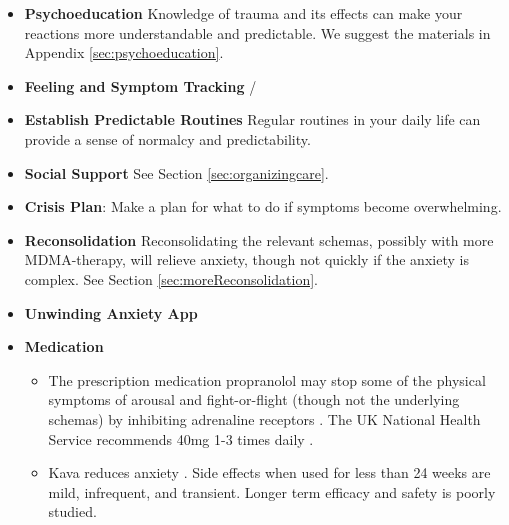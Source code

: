\documentclass[12pt,letterpaper]{book}
\begin{document}
\begin{itemize}
\begin{itemize}
    \end{itemize}
    \item \textbf{Psychoeducation} Knowledge of trauma and its effects can make your reactions more understandable and predictable. We suggest the materials in Appendix \ref{sec:psychoeducation}.
    \item \textbf{Feeling and Symptom Tracking} /
    \item \textbf{Establish Predictable Routines} Regular routines in your daily life can provide a sense of normalcy and predictability. 
    \item \textbf{Social Support} See Section \ref{sec:organizingcare}.
    \item \textbf{Crisis Plan}: Make a plan for what to do if symptoms become overwhelming. 
    \item \textbf{Reconsolidation} Reconsolidating the relevant schemas, possibly with more MDMA-therapy, will relieve anxiety, though not quickly if the anxiety is complex. See Section \ref{sec:moreReconsolidation}.
    \item \textbf{Unwinding Anxiety App} \todo{}
    \item \textbf{Medication}
    \begin{itemize}
        \item The prescription medication propranolol may stop some of the physical symptoms of arousal and fight-or-flight (though not the underlying schemas) by inhibiting adrenaline receptors \cite{steenenPropranalol}. The UK National Health Service recommends 40mg 1-3 times daily \cite{nhsPropranalol}.
        \item Kava reduces anxiety \cite{Pittler03kava}. Side effects when used for less than 24 weeks are mild, infrequent, and transient. Longer term efficacy and safety is poorly studied.
    \end{itemize}
\end{itemize}
\end{document}
